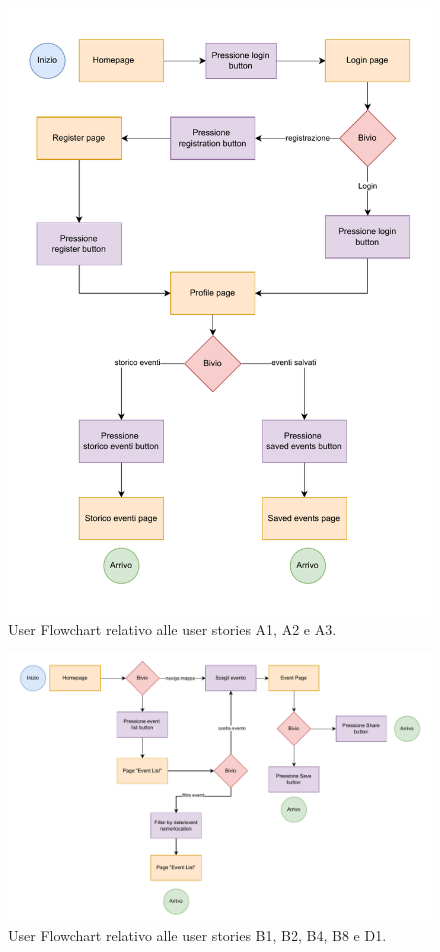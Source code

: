 \documentclass[9pt]{extarticle}
\begin{document}
\begin{figure}[!htb]
	\centering
	\includegraphics[width=0.7\linewidth]{./images/A1-A2-A3.pdf}
	\caption{User Flowchart relativo alle user stories A1, A2 e A3.}
	\label{fig:A1-A2}
\end{figure}

\newpage 

\begin{figure}[!htb]
	\centering
	\includegraphics[width=\linewidth]{./images/B1-B2-B4-B8-D1.pdf}
	\caption{User Flowchart relativo alle user stories B1, B2, B4, B8 e D1.}
	\label{fig:B1-C1}
\end{figure}
\end{document}
